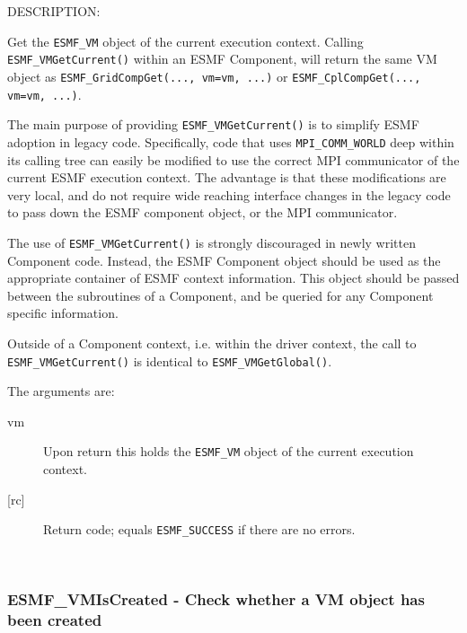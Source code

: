 {\sf DESCRIPTION:\\ }


     \begin{sloppypar}
     Get the {\tt ESMF\_VM} object of the current execution context. Calling
     {\tt ESMF\_VMGetCurrent()} within an ESMF Component, will return the
     same VM object as
     {\tt ESMF\_GridCompGet(..., vm=vm, ...)} or
     {\tt ESMF\_CplCompGet(..., vm=vm, ...)}. 
     \end{sloppypar}
   
     The main purpose of providing {\tt ESMF\_VMGetCurrent()} is to simplify ESMF
     adoption in legacy code. Specifically, code that uses {\tt MPI\_COMM\_WORLD}
     deep within its calling tree can easily be modified to use the correct MPI
     communicator of the current ESMF execution context. The advantage is that
     these modifications are very local, and do not require wide reaching
     interface changes in the legacy code to pass down the ESMF component object,
     or the MPI communicator.
  
     The use of {\tt ESMF\_VMGetCurrent()} is strongly discouraged in newly
     written Component code. Instead, the ESMF Component object should be used as
     the appropriate container of ESMF context information. This object should be
     passed between the subroutines of a Component, and be queried for any
     Component specific information.
  
     Outside of a Component context, i.e. within the driver context, the call
     to {\tt ESMF\_VMGetCurrent()} is identical to {\tt ESMF\_VMGetGlobal()}.
  
     The arguments are:
     \begin{description}
     \item[vm] 
       Upon return this holds the {\tt ESMF\_VM} object of the current execution
       context.
     \item[{[rc]}] 
       Return code; equals {\tt ESMF\_SUCCESS} if there are no errors.
     \end{description}
   
 
\mbox{}\hrulefill\ 
 
\subsubsection [ESMF\_VMIsCreated] {ESMF\_VMIsCreated - Check whether a VM object has been created}


